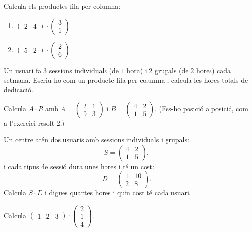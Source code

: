 \begin{exercicis}
\begin{exlist}
  \item Calcula els productes fila per columna:
        \begin{enumerate}[label=\alph*), leftmargin=1.6em, topsep=2pt]
          \item $\begin{pmatrix} 2 & 4 \end{pmatrix}\cdot\begin{pmatrix} 3 \\ 1 \end{pmatrix}$
          \item $\begin{pmatrix} 5 & 2 \end{pmatrix}\cdot\begin{pmatrix} 2 \\ 6 \end{pmatrix}$
        \end{enumerate}
  \item Un usuari fa $3$ sessions individuals (de $1$ hora) i $2$ grupals (de
        $2$ hores) cada setmana. Escriu-ho com un producte fila per columna i
        calcula les hores totals de dedicació.
  \item Calcula $A\cdot B$ amb
        $A=\begin{pmatrix} 2 & 1 \\ 0 & 3 \end{pmatrix}$ i
        $B=\begin{pmatrix} 4 & 2 \\ 1 & 5 \end{pmatrix}$.
        (Fes-ho posició a posició, com a l'exercici resolt 2.)
  \item Un centre atén dos usuaris amb sessions individuals i grupals:
        \[ S=\begin{pmatrix} 4 & 2 \\ 1 & 5 \end{pmatrix}, \]
        i cada tipus de sessió dura unes hores i té un cost:
        \[ D=\begin{pmatrix} 1 & 10 \\ 2 & 8 \end{pmatrix}. \]
        Calcula $S\cdot D$ i digues quantes hores i quin cost té cada usuari.
  \item Calcula $\begin{pmatrix} 1 & 2 & 3 \end{pmatrix}\cdot\begin{pmatrix} 2 \\ 1 \\ 4 \end{pmatrix}$.

\end{exlist}
\end{exercicis}
